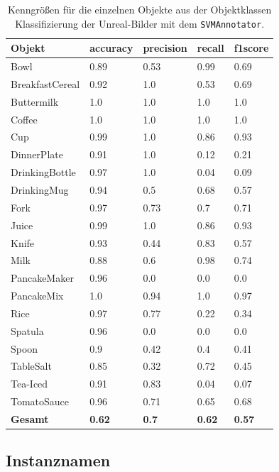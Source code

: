 \begin{table}
\centering
\small
{}
\begin{tabularx}{\textwidth}{Xllll}
\textbf{Objekt}	& \textbf{\gls{accuracy}} & \textbf{\gls{precision}}	& \textbf{\gls{recall}}	& \textbf{\gls{f1score}} \\ \hline
Bowl & 0.89 & 0.53 & 0.99 & 0.69 \\  
BreakfastCereal & 0.92 & 1.0 & 0.53 & 0.69 \\  
Buttermilk & 1.0 & 1.0 & 1.0 & 1.0 \\  
Coffee & 1.0 & 1.0 & 1.0 & 1.0 \\  
Cup & 0.99 & 1.0 & 0.86 & 0.93 \\  
DinnerPlate & 0.91 & 1.0 & 0.12 & 0.21 \\  
DrinkingBottle & 0.97 & 1.0 & 0.04 & 0.09 \\  
DrinkingMug & 0.94 & 0.5 & 0.68 & 0.57 \\  
Fork & 0.97 & 0.73 & 0.7 & 0.71 \\  
Juice & 0.99 & 1.0 & 0.86 & 0.93 \\  
Knife & 0.93 & 0.44 & 0.83 & 0.57 \\  
Milk & 0.88 & 0.6 & 0.98 & 0.74 \\  
PancakeMaker & 0.96 & 0.0 & 0.0 & 0.0 \\  
PancakeMix & 1.0 & 0.94 & 1.0 & 0.97 \\  
Rice & 0.97 & 0.77 & 0.22 & 0.34 \\  
Spatula & 0.96 & 0.0 & 0.0 & 0.0 \\  
Spoon & 0.9 & 0.42 & 0.4 & 0.41 \\  
TableSalt & 0.85 & 0.32 & 0.72 & 0.45 \\  
Tea-Iced & 0.91 & 0.83 & 0.04 & 0.07 \\  
TomatoSauce & 0.96 & 0.71 & 0.65 & 0.68 \\    \hline
\textbf{Gesamt}		&	\textbf{0.62}   &	\textbf{0.7}  & \textbf{0.62}     &  \textbf{0.57}     \\
\end{tabularx}
\caption[Objektklassen-spezifische Kenngrößen des SVMAnnotators]{Kenngrößen für die einzelnen Objekte aus der Objektklassen Klassifizierung der Unreal-Bilder mit dem \texttt{SVMAnnotator}.}
\label{tab:SVMClassifierGTClass_metrics}
\end{table}

\subsection{Instanznamen}

